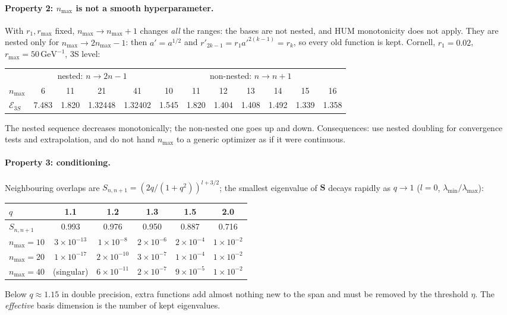\documentclass[11pt,a4paper]{article}
\numberwithin{equation}{section}
\theoremstyle{definition}
\theoremstyle{plain}
\theoremstyle{remark}
\numberwithin{algorithm}{section}
\newcommand{\GeV}{\,\mathrm{GeV}}
\newcommand{\mS}{\mathbf S}
\begin{document}
\paragraph{Property 2: $n_{\max}$ is not a smooth hyperparameter.} With $r_1,r_{\max}$ fixed, $n_{\max}\to n_{\max}+1$ changes \emph{all} the ranges: the bases are not nested, and HUM monotonicity does not apply. They are nested only for $n_{\max}\to2n_{\max}-1$: then $a'=a^{1/2}$ and $r'_{2k-1}=r_1a'^{2(k-1)}=r_k$, so every old function is kept. Cornell, $r_1=0.02$, $r_{\max}=50\GeV^{-1}$, 3S level:
\begin{center}\small
\begin{tabular}{@{}lcccc|ccccccc@{}}\toprule
 & \multicolumn{4}{c|}{nested: $n\to2n-1$} & \multicolumn{7}{c}{non-nested: $n\to n+1$}\\
$n_{\max}$ & 6 & 11 & 21 & 41 & 10 & 11 & 12 & 13 & 14 & 15 & 16\\\midrule
$\mathcal E_{3S}$ & 7.483 & 1.820 & 1.32448 & 1.32402 & 1.545 & 1.820 & 1.404 & 1.408 & 1.492 & 1.339 & 1.358\\\bottomrule
\end{tabular}
\end{center}
The nested sequence decreases monotonically; the non-nested one goes up and down. Consequences: use nested doubling for convergence tests and extrapolation, and do not hand $n_{\max}$ to a generic optimizer as if it were continuous.

\paragraph{Property 3: conditioning.} Neighbouring overlaps are $S_{n,n+1}=(2q/(1+q^2))^{l+3/2}$; the smallest eigenvalue of $\mS$ decays rapidly as $q\to1$ ($l=0$, $\lambda_{\min}/\lambda_{\max}$):
\begin{center}\small
\begin{tabular}{@{}lccccc@{}}\toprule
$q$ & 1.1 & 1.2 & 1.3 & 1.5 & 2.0\\\midrule
$S_{n,n+1}$ & 0.993 & 0.976 & 0.950 & 0.887 & 0.716\\
$n_{\max}=10$ & $3\times10^{-13}$ & $1\times10^{-8}$ & $2\times10^{-6}$ & $2\times10^{-4}$ & $1\times10^{-2}$\\
$n_{\max}=20$ & $1\times10^{-17}$ & $2\times10^{-10}$ & $3\times10^{-7}$ & $1\times10^{-4}$ & $1\times10^{-2}$\\
$n_{\max}=40$ & (singular) & $6\times10^{-11}$ & $2\times10^{-7}$ & $9\times10^{-5}$ & $1\times10^{-2}$\\\bottomrule
\end{tabular}
\end{center}
Below $q\approx1.15$ in double precision, extra functions add almost nothing new to the span and must be removed by the threshold $\eta$. The \emph{effective} basis dimension is the number of kept eigenvalues.
\end{document}
